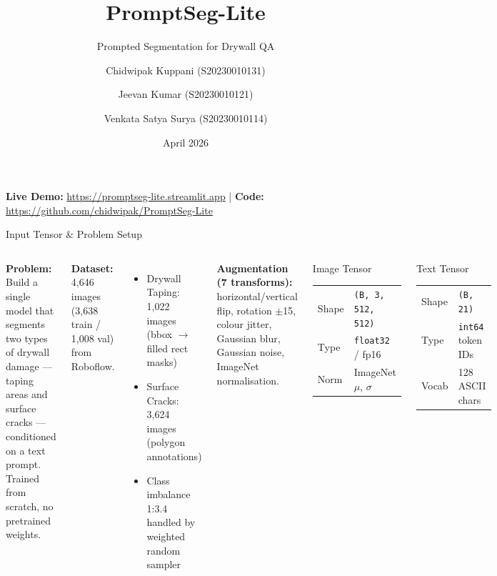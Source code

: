 \documentclass[aspectratio=169, 10pt]{beamer}
\title{\textbf{PromptSeg-Lite}}
\subtitle{Prompted Segmentation for Drywall QA}
\author{
  Chidwipak Kuppani (S20230010131) \and
  Jeevan Kumar (S20230010121) \and
  Venkata Satya Surya (S20230010114)
}
\date{April 2026}
\institute{Deep Learning Course Project}
\begin{document}
{
\begin{frame}[plain]
\titlepage
\vfill
\centering\footnotesize
\textbf{Live Demo:} \url{https://promptseg-lite.streamlit.app}
\quad|\quad
\textbf{Code:} \url{https://github.com/chidwipak/PromptSeg-Lite}
\end{frame}
}

\begin{frame}{Input Tensor \& Problem Setup}
\footnotesize

\begin{columns}[T]

\textbf{Problem:} Build a single model that segments two types of drywall damage ---
taping areas and surface cracks --- conditioned on a text prompt.
Trained from scratch, no pretrained weights.

\medskip
\textbf{Dataset:} 4,646 images (3,638 train / 1,008 val) from Roboflow.
\begin{itemize}
  \item Drywall Taping: 1,022 images (bbox $\to$ filled rect masks)
  \item Surface Cracks: 3,624 images (polygon annotations)
  \item Class imbalance 1:3.4 handled by weighted random sampler
\end{itemize}

\medskip
\textbf{Augmentation (7 transforms):}
horizontal/vertical flip, rotation $\pm$15\textdegree, colour jitter,
Gaussian blur, Gaussian noise, ImageNet normalisation.


\begin{block}{Image Tensor}
\begin{tabular}{@{}ll@{}}
Shape  & \texttt{(B, 3, 512, 512)} \\
Type   & \texttt{float32} / fp16 \\
Norm   & ImageNet $\mu$, $\sigma$ \\
\end{tabular}
\end{block}

\begin{block}{Text Tensor}
\begin{tabular}{@{}ll@{}}
Shape  & \texttt{(B, 21)} \\
Type   & \texttt{int64} token IDs \\
Vocab  & 128 ASCII chars \\
\end{tabular}
\end{block}


\end{columns}
\end{frame}
\end{document}
